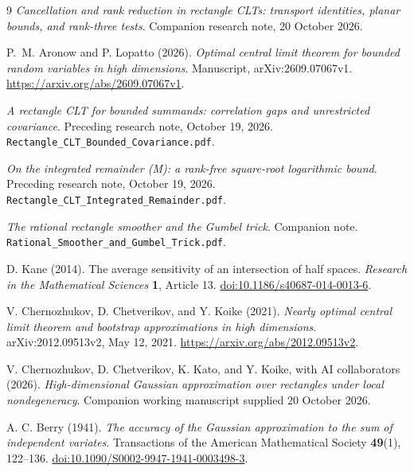 \documentclass[11pt,a4paper]{article}
\theoremstyle{remark}
\begin{document}
\begin{thebibliography}{9}
\emph{Cancellation and rank reduction in rectangle CLTs:
transport identities, planar bounds, and rank-three tests}.
Companion research note, 20 October 2026.

P.~M. Aronow and P. Lopatto (2026).
\emph{Optimal central limit theorem for bounded random variables in high dimensions}.
Manuscript, arXiv:2609.07067v1.
\url{https://arxiv.org/abs/2609.07067v1}.

\emph{A rectangle CLT for bounded summands: correlation gaps and
unrestricted covariance}.
Preceding research note, October 19, 2026.
\texttt{Rectangle\_CLT\_Bounded\_Covariance.pdf}.

\emph{On the integrated remainder (M): a rank-free square-root
logarithmic bound}.
Preceding research note, October 19, 2026.
\texttt{Rectangle\_CLT\_Integrated\_Remainder.pdf}.

{\raggedright
\emph{The rational rectangle smoother and the Gumbel trick}.
Companion note.
\texttt{Rational\_Smoother\_and\_Gumbel\_Trick.pdf}.\par}

D. Kane (2014).
The average sensitivity of an intersection of half spaces.
\emph{Research in the Mathematical Sciences} \textbf{1}, Article 13.
\href{https://doi.org/10.1186/s40687-014-0013-6}{doi:10.1186/s40687-014-0013-6}.

V. Chernozhukov, D. Chetverikov, and Y. Koike (2021).
\emph{Nearly optimal central limit theorem and bootstrap approximations
in high dimensions}.
arXiv:2012.09513v2, May 12, 2021.
\url{https://arxiv.org/abs/2012.09513v2}.

V. Chernozhukov, D. Chetverikov, K. Kato, and Y. Koike,
with AI collaborators (2026).
\emph{High-dimensional Gaussian approximation over rectangles under
local nondegeneracy}. Companion working manuscript supplied
20 October 2026.

A. C. Berry (1941).
\emph{The accuracy of the Gaussian approximation to the sum of independent variates}.
Transactions of the American Mathematical Society \textbf{49}(1), 122--136.
\href{https://doi.org/10.1090/S0002-9947-1941-0003498-3}{doi:10.1090/S0002-9947-1941-0003498-3}.

\end{thebibliography}
\end{document}
